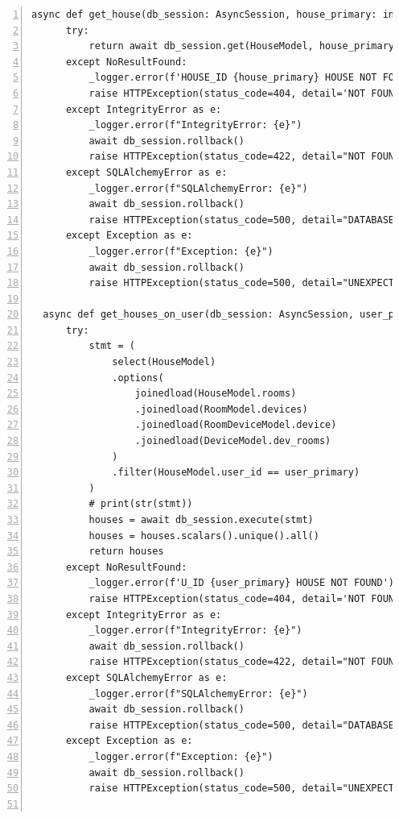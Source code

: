 \documentclass[12pt, letterpaper]{article}
\begin{document}
\begin{lstlisting}[frame=single, style=py, numbers=left, label={lst:dbqueries}, caption={db: queries.py}]
  async def get_house(db_session: AsyncSession, house_primary: int):
      try:
          return await db_session.get(HouseModel, house_primary)
      except NoResultFound:
          _logger.error(f'HOUSE_ID {house_primary} HOUSE NOT FOUND')
          raise HTTPException(status_code=404, detail='NOT FOUND')
      except IntegrityError as e:
          _logger.error(f"IntegrityError: {e}")
          await db_session.rollback()
          raise HTTPException(status_code=422, detail="NOT FOUND")
      except SQLAlchemyError as e:
          _logger.error(f"SQLAlchemyError: {e}")
          await db_session.rollback()
          raise HTTPException(status_code=500, detail="DATABASE ERROR")
      except Exception as e:
          _logger.error(f"Exception: {e}")
          await db_session.rollback()
          raise HTTPException(status_code=500, detail="UNEXPECTED DATABASE ERROR")
  
  async def get_houses_on_user(db_session: AsyncSession, user_primary: int):
      try:
          stmt = (
              select(HouseModel)
              .options(
                  joinedload(HouseModel.rooms)
                  .joinedload(RoomModel.devices)
                  .joinedload(RoomDeviceModel.device)
                  .joinedload(DeviceModel.dev_rooms)
              )
              .filter(HouseModel.user_id == user_primary)
          )
          # print(str(stmt))
          houses = await db_session.execute(stmt)
          houses = houses.scalars().unique().all()
          return houses
      except NoResultFound:
          _logger.error(f'U_ID {user_primary} HOUSE NOT FOUND')
          raise HTTPException(status_code=404, detail='NOT FOUND')
      except IntegrityError as e:
          _logger.error(f"IntegrityError: {e}")
          await db_session.rollback()
          raise HTTPException(status_code=422, detail="NOT FOUND")
      except SQLAlchemyError as e:
          _logger.error(f"SQLAlchemyError: {e}")
          await db_session.rollback()
          raise HTTPException(status_code=500, detail="DATABASE ERROR")
      except Exception as e:
          _logger.error(f"Exception: {e}")
          await db_session.rollback()
          raise HTTPException(status_code=500, detail="UNEXPECTED DATABASE ERROR")
      

\end{lstlisting}
\end{document}

